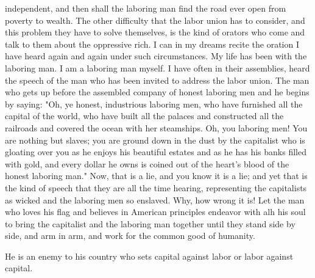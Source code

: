 \documentclass[10pt]{article}
\begin{document}
independent, and then shall the laboring man find the road ever open from poverty to wealth. The other difficulty that the labor union has to consider, and this problem they have to solve themselves, is the kind of orators who come and talk to them about the oppressive rich. I can in my dreams recite the oration I have heard again and again under such circumstances. My life has been with the laboring man. I am a laboring man myself. I have often in their assemblies, heard the speech of the man who has been invited to address the labor union. The man who gets up before the assembled company of honest laboring men and he begins by saying: "Oh, ye honest, industrious laboring men, who have furnished all the capital of the world, who have built all the palaces and constructed all the railroads and covered the ocean with her steamships. Oh, you laboring men! You are nothing but slaves; you are ground down in the dust by the capitalist who is gloating over you as he enjoys his beautiful estates and as he has his banks filled with gold, and every dollar he owns is coined out of the heart's blood of the honest laboring man." Now, that is a lie, and you know it is a lie; and yet that is the kind of speech that they are all the time hearing, representing the capitalists as wicked and the laboring men so enslaved. Why, how wrong it is! Let the man who loves his flag and believes in American principles endeavor with alh his soul to bring the capitalist and the laboring man together until they stand side by side, and arm in arm, and work for the common good of humanity.

He is an enemy to his country who sets capital against labor or labor against capital.
\end{document}
